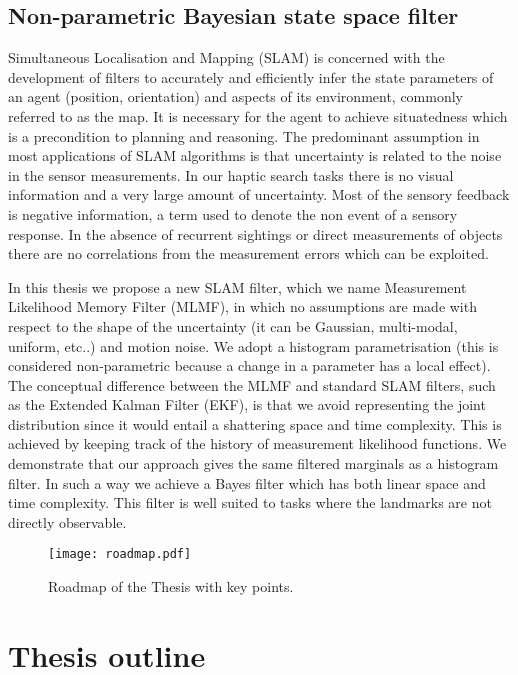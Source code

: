 \subsection{Non-parametric Bayesian state space filter}\label{sub:contr3}

%
%

Simultaneous Localisation and Mapping (SLAM) is concerned with the development of filters to accurately and efficiently infer 
the state parameters of an agent (position, orientation) and aspects of its environment, commonly referred to as the map. 
It is necessary for the agent to achieve situatedness which is a precondition to planning and reasoning. The 
predominant assumption in most applications of SLAM algorithms is that uncertainty is related to the noise in the sensor measurements. In 
our haptic search tasks there is no visual information and a very large amount of uncertainty. Most of the sensory
feedback is negative information, a term used to denote the non event of a sensory response.
In the absence of recurrent sightings or direct measurements of objects there are no correlations from the measurement errors 
which can be exploited. 

In this thesis we propose a new SLAM filter, which we name Measurement Likelihood Memory Filter (MLMF), in 
which no assumptions are made with respect to the shape of the uncertainty (it can be Gaussian, multi-modal, uniform, etc..) and 
motion noise. We adopt a histogram parametrisation (this is considered non-parametric because a change in a parameter has a local effect). 
The conceptual difference between the MLMF and standard SLAM filters, 
such as the Extended Kalman Filter (EKF), is that we avoid representing the joint distribution since it would entail a shattering space and time complexity. 
This is achieved by keeping track of the history of measurement likelihood functions. We demonstrate that our approach gives 
the same filtered marginals as a histogram filter. In such a way we achieve a Bayes filter which has both linear space and 
time complexity. This filter is well suited to tasks where the landmarks are not directly observable.


\begin{figure}
  \centering
  \texttt{[image: roadmap.pdf]}
  \caption{Roadmap of the Thesis with key points. }
\end{figure}

\section{Thesis outline}

